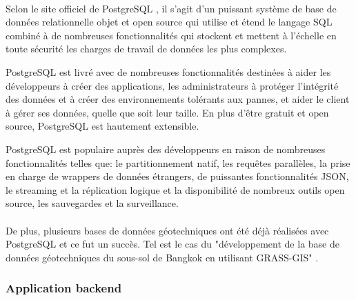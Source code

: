          \paragraph{}
         Selon le site officiel de PostgreSQL \cite{psql},
         il s'agit d'un puissant système de base de données relationnelle objet et open 
         source qui utilise et étend le langage SQL combiné à de nombreuses fonctionnalités
          qui stockent et mettent à l'échelle en toute sécurité les charges de travail de 
          données les plus complexes.
          \par 
          PostgreSQL est livré avec de nombreuses fonctionnalités destinées à aider les 
          développeurs à créer des applications, les administrateurs à protéger 
          l'intégrité des données et à créer des environnements tolérants aux pannes, 
          et aider le client à gérer ses données, quelle que soit leur taille. 
          En plus d'être gratuit et open source, PostgreSQL est hautement extensible.
          \par 
          PostgreSQL est populaire auprès des développeurs en raison de nombreuses fonctionnalités
           telles que: le partitionnement natif, les requêtes parallèles, la prise en charge 
           de wrappers de données étrangers, de puissantes fonctionnalités JSON, le streaming et 
           la réplication logique et la disponibilité de nombreux outils open source,
            les sauvegardes et la surveillance.
            \paragraph{}
            De plus, plusieurs bases de données géotechniques ont été 
            déjà réalisées avec PostgreSQL et ce fut un succès. Tel est le cas du
            "développement de la base de données géotechniques du sous-sol de Bangkok 
            en utilisant GRASS-GIS" \cite{panoot2001development}.
        \subsubsection{Application backend}
